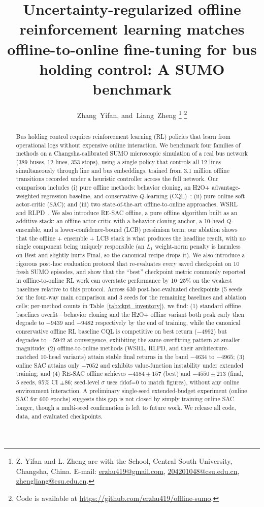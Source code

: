 \documentclass[journal,10pt]{IEEEtran}
\title{Uncertainty-regularized offline reinforcement learning matches offline-to-online fine-tuning for bus holding control: A SUMO benchmark}
\author{Zhang~Yifan, and~Liang~Zheng%
\thanks{Z. Yifan and L. Zheng are with the School, Central South University, Changsha, China. E-mail: \href{mailto:erzhu419@gmail.com}{erzhu419@gmail.com}, \href{mailto:204201048@csu.edu.cn}{204201048@csu.edu.cn}, \href{mailto:zhengliang@csu.edu.cn}{zhengliang@csu.edu.cn}.}%
\thanks{Code is available at \url{https://github.com/erzhu419/offline-sumo}.}}
\begin{document}
\maketitle

\begin{abstract}
Bus holding control requires reinforcement learning (RL) policies that learn from operational logs without expensive online interaction. We benchmark four families of methods on a Changsha-calibrated SUMO microscopic simulation of a real bus network (389 buses, 12 lines, 353 stops), using a single policy that controls all 12 lines simultaneously through line and bus embeddings, trained from 3.1 million offline transitions recorded under a heuristic controller across the full network. Our comparison includes (i) pure offline methods: behavior cloning, an H2O+ advantage-weighted regression baseline, and conservative $Q$-learning (CQL)~\cite{kumar2020conservative}; (ii) pure online soft actor-critic (SAC); and (iii) two state-of-the-art offline-to-online approaches, WSRL~\cite{zhou2024efficient} and RLPD~\cite{ball2023efficient}. We also introduce RE-SAC offline, a pure offline algorithm built as an additive stack: an offline actor-critic with a behavior-cloning anchor, a 10-head $Q$-ensemble, and a lower-confidence-bound (LCB) pessimism term; our ablation shows that the offline + ensemble + LCB stack is what produces the headline result, with no single component being uniquely responsible (an $L_1$ weight-norm penalty is harmless on Best and slightly hurts Final, so the canonical recipe drops it). We also introduce a rigorous post-hoc evaluation protocol that re-evaluates every saved checkpoint on 10 fresh SUMO episodes, and show that the ``best'' checkpoint metric commonly reported in offline-to-online RL work can overstate performance by 10--25\% on the weakest baselines relative to this protocol. Across 630 post-hoc-evaluated checkpoints (5 seeds for the four-way main comparison and 3 seeds for the remaining baselines and ablation cells; per-method counts in Table~\ref{tab:ckpt_inventory}), we find: (1) standard offline baselines overfit---behavior cloning and the H2O+ offline variant both peak early then degrade to $-9439$ and $-9482$ respectively by the end of training, while the canonical conservative offline RL baseline CQL is competitive on best return ($-4992$) but degrades to $-5942$ at convergence, exhibiting the same overfitting pattern at smaller magnitude; (2) offline-to-online methods (WSRL, RLPD, and their architecture-matched 10-head variants) attain stable final returns in the band $-4634$ to $-4965$; (3) online SAC attains only $-7052$ and exhibits value-function instability under extended training; and (4) RE-SAC offline achieves $-4184 \pm 157$ (best) and $-4550 \pm 213$ (final, 5 seeds, 95\% CI $\pm 86$; seed-level $\sigma$ uses ddof=0 to match figures), without any online environment interaction. A preliminary single-seed extended-budget experiment (online SAC for 600 epochs) suggests this gap is not closed by simply training online SAC longer, though a multi-seed confirmation is left to future work. We release all code, data, and evaluated checkpoints.
\end{abstract}
\end{document}
